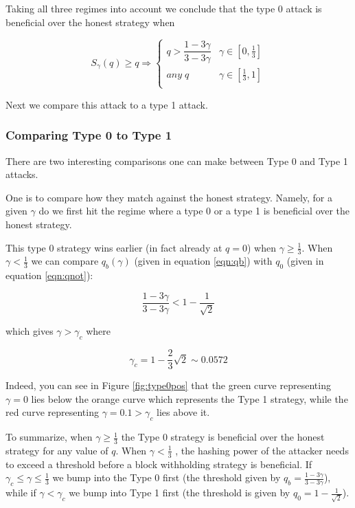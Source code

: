 \documentclass[letterpaper,12pt]{report}
\theoremstyle{plain}
\theoremstyle{definition}
\begin{document}
Taking all three regimes into account we conclude that the type 0 attack is beneficial over the honest strategy when

\begin{equation}\label{0overhonest}
S_{\gamma}(q)\geq q \Longrightarrow
\begin{cases}
q>\dfrac{1-3\gamma}{3-3\gamma} & \gamma\in [0,\frac{1}{3}] \\ 
\mathit{any\;} q & \gamma\in [\frac{1}{3},1] \\ 
\end{cases}
\end{equation}

Next we compare this attack to a type 1 attack.

\subsubsection{Comparing Type 0 to Type 1}

There are two interesting comparisons one can make between Type 0 and Type 1 attacks.

One is to compare how they match against the honest strategy. Namely, for a given $\gamma$ do we first hit the regime where a type 0 or a type 1 is beneficial over the honest strategy.

This type 0 strategy wins earlier (in fact already at $q=0$) when $\gamma\geq\frac{1}{3}$. When $\gamma < \frac{1}{3}$ we can compare $q_b(\gamma)$ (given in equation \ref{eqn:qb}) with $q_0$ (given in equation \ref{eqn:qnot}):

\begin{equation}\label{qbornot}
\dfrac{1-3\gamma}{3-3\gamma}<1-\dfrac{1}{\sqrt{2}}
\end{equation}

which gives $\gamma>\gamma_c$ where 

\begin{equation}\label{gamma0before1}
\gamma_c=1-\frac{2}{3}\sqrt{2}\sim 0.0572
\end{equation}

Indeed, you can see in Figure \ref{fig:type0pos} that the green curve representing $\gamma=0$ lies below the orange curve which represents the Type 1 strategy, while the red curve representing $\gamma=0.1>\gamma_c$ lies above it.

To summarize, when $\gamma\geq\frac{1}{3}$ the Type 0 strategy is beneficial over the honest strategy for any value of $q$. When $\gamma<\frac{1}{3}$ , the hashing power of the attacker needs to exceed a threshold before a block withholding strategy is beneficial. If $\gamma_c\leq\gamma\leq\frac{1}{3}$ we bump into the Type 0 first (the threshold given by $q_b=\frac{1-3\gamma}{3-3\gamma}$), while if $\gamma<\gamma_c$ we bump into Type 1 first (the threshold is given by $q_0=1-\frac{1}{\sqrt{2}}$).
\end{document}
